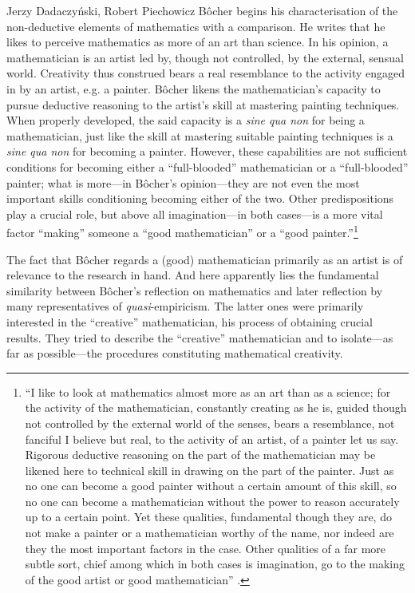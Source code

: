 \begin{artengenv}{Jerzy Dadaczyński, Robert Piechowicz}
Bôcher begins his characterisation of the non-deductive elements of mathematics with a comparison. He writes that he likes to perceive mathematics as more of an art than science. In his opinion, a mathematician is an artist led by, though not controlled, by the external, sensual world. Creativity thus construed bears a real resemblance to the activity engaged in by an artist, e.g. a painter. Bôcher likens the mathematician's capacity to pursue deductive reasoning to the artist's skill at mastering painting techniques. When properly developed, the said capacity is a \textit{sine qua non} for being a mathematician, just like the skill at mastering suitable painting techniques is a \textit{sine qua non} for becoming a painter. However, these capabilities are not sufficient conditions for becoming either a ``full-blooded'' mathematician or a ``full-blooded'' painter; what is more---in Bôcher's opinion---they are not even the most important skills conditioning becoming either of the two. Other predispositions play a crucial role, but above all imagination---in both cases---is a more vital factor ``making'' someone a ``good mathematician'' or a ``good painter.''\footnote{``I like to look at mathematics almost more as an art than as a science; for the activity of the mathematician, constantly creating as he is, guided though not controlled by the external world of the senses, bears a resemblance, not fanciful I believe but real, to the activity of an artist, of a painter let us say. Rigorous deductive reasoning on the part of the mathematician may be likened here to technical skill in drawing on the part of the painter. Just as no one can become a good painter without a certain amount of this skill, so no one can become a mathematician without the power to reason accurately up to a certain point. Yet these qualities, fundamental though they are, do not make a painter or a mathematician worthy of the name, nor indeed are they the most important factors in the case. Other qualities of a far more subtle sort, chief among which in both cases is imagination, go to the making of the good artist or good mathematician''
\parencite[][p.133]{bocher_fundamental_1904}.%
}

The fact that Bôcher regards a (good) mathematician primarily as an artist is of relevance to the research in hand. And here apparently lies the fundamental similarity between Bôcher's reflection on mathematics and later reflection by many representatives of \textit{quasi}-empiricism. The latter ones were primarily interested in the ``creative'' mathematician, his process of obtaining crucial results. They tried to describe the ``creative'' mathematician and to isolate---as far as possible---the procedures constituting mathematical creativity.


\end{artengenv}

